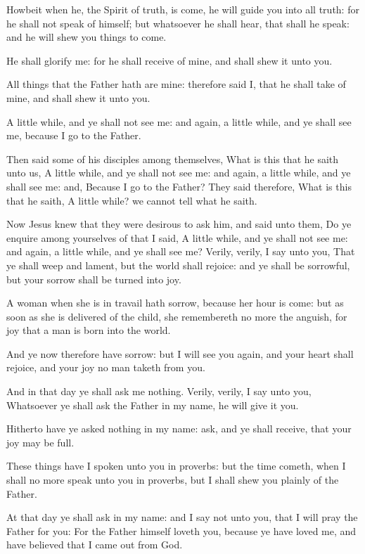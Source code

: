 \Verse Howbeit when he, the Spirit of truth, is come, he will guide you into all truth: for he shall not speak of himself; but whatsoever he shall hear, that shall he speak: and he will shew you things to come.

\Verse He shall glorify me: for he shall receive of mine, and shall shew it unto you.

\Verse All things that the Father hath are mine: therefore said I, that he shall take of mine, and shall shew it unto you.

\Verse A little while, and ye shall not see me: and again, a little while, and ye shall see me, because I go to the Father.

\Verse Then said some of his disciples among themselves, What is this that he saith unto us, A little while, and ye shall not see me: and again, a little while, and ye shall see me: and, Because I go to the Father?  \Verse They said therefore, What is this that he saith, A little while? we cannot tell what he saith.

\Verse Now Jesus knew that they were desirous to ask him, and said unto them, Do ye enquire among yourselves of that I said, A little while, and ye shall not see me: and again, a little while, and ye shall see me?  \Verse Verily, verily, I say unto you, That ye shall weep and lament, but the world shall rejoice: and ye shall be sorrowful, but your sorrow shall be turned into joy.

\Verse A woman when she is in travail hath sorrow, because her hour is come: but as soon as she is delivered of the child, she remembereth no more the anguish, for joy that a man is born into the world.

\Verse And ye now therefore have sorrow: but I will see you again, and your heart shall rejoice, and your joy no man taketh from you.

\Verse And in that day ye shall ask me nothing. Verily, verily, I say unto you, Whatsoever ye shall ask the Father in my name, he will give it you.

\Verse Hitherto have ye asked nothing in my name: ask, and ye shall receive, that your joy may be full.

\Verse These things have I spoken unto you in proverbs: but the time cometh, when I shall no more speak unto you in proverbs, but I shall shew you plainly of the Father.

\Verse At that day ye shall ask in my name: and I say not unto you, that I will pray the Father for you: \Verse For the Father himself loveth you, because ye have loved me, and have believed that I came out from God.

